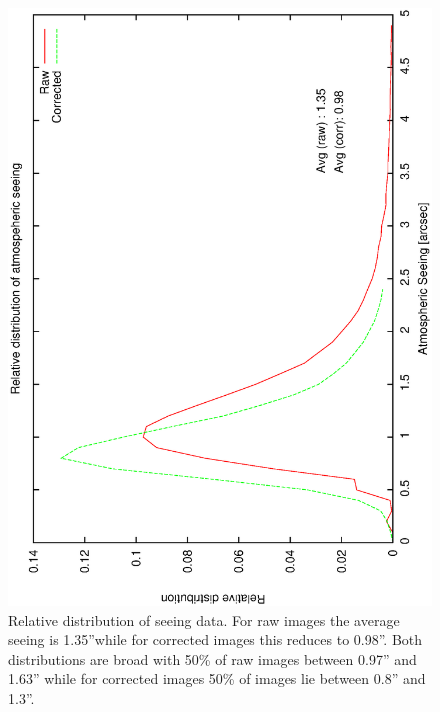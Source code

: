 {{\begin{figure}[htbp]
\begin{center}
    \includegraphics[scale=0.4, angle=-90]{figures/ecs/seeing_dist.eps}
\end{center} 
\caption[Relative distribution of seeing data.] {Relative distribution of seeing data. For raw images the average seeing is 1.35''while for corrected images this reduces to 0.98''. Both distributions are broad with 50\% of raw images between 0.97'' and 1.63'' while for corrected images 50\% of images lie between 0.8'' and 1.3''.}
\label{fig:see_dist}
\end{figure}

}}
